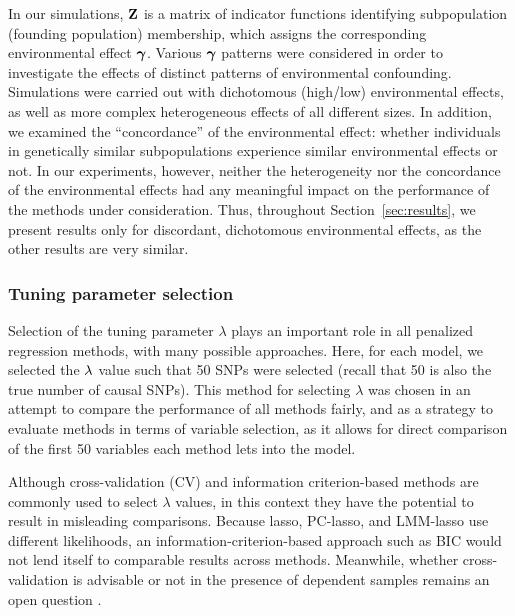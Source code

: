 In our simulations, $\mathbf{Z}$ is a matrix of indicator functions identifying subpopulation (founding population) membership, which assigns the corresponding environmental effect $\boldsymbol{\gamma}$. Various $\boldsymbol{\gamma}$ patterns were considered in order to investigate the effects of distinct patterns of environmental confounding.  Simulations were carried out with dichotomous (high/low) environmental effects, as well as more complex heterogeneous effects of all different sizes.  In addition, we examined the ``concordance'' of the environmental effect: whether individuals in genetically similar subpopulations experience similar environmental effects or not.  In our experiments, however, neither the heterogeneity nor the concordance of the environmental effects had any meaningful impact on the performance of the methods under consideration.  Thus, throughout Section~\ref{sec:results}, we present results only for discordant, dichotomous environmental effects, as the other results are very similar.

\subsubsection{Tuning parameter selection}

Selection of the tuning parameter $\lambda$ plays an important role in all penalized regression methods, with many possible approaches. Here, for each model, we selected the $\lambda$ value such that 50 SNPs were selected (recall that 50 is also the true number of causal SNPs). This method for selecting $\lambda$ was chosen in an attempt to compare the performance of all methods fairly, and as a strategy to evaluate methods in terms of variable selection, as it allows for direct comparison of the first 50 variables each method lets into the model.

Although cross-validation (CV) and information criterion-based methods are commonly used to select $\lambda$ values, in this context they have the potential to result in misleading comparisons. Because lasso, PC-lasso, and LMM-lasso use different likelihoods, an information-criterion-based approach such as BIC would not lend itself to comparable results across methods. Meanwhile, whether cross-validation is advisable or not in the presence of dependent samples remains an open question \citep{roberts2017cross}. 


\subsection{}

